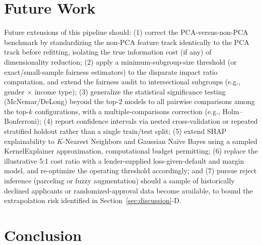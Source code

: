 \documentclass[journal]{IEEEtran}
\begin{document}
\section{Future Work}
\label{sec:futurework}

Future extensions of this pipeline should: (1) correct the PCA-versus-non-PCA benchmark by standardizing the non-PCA feature track identically to the PCA track before refitting, isolating the true information cost (if any) of dimensionality reduction; (2) apply a minimum-subgroup-size threshold (or exact/small-sample fairness estimators) to the disparate impact ratio computation, and extend the fairness audit to intersectional subgroups (e.g., gender $\times$ income type); (3) generalize the statistical significance testing (McNemar/DeLong) beyond the top-2 models to all pairwise comparisons among the top-$k$ configurations, with a multiple-comparisons correction (e.g., Holm--Bonferroni); (4) report confidence intervals via nested cross-validation or repeated stratified holdout rather than a single train/test split; (5) extend SHAP explainability to $K$-Nearest Neighbors and Gaussian Naïve Bayes using a sampled KernelExplainer approximation, computational budget permitting; (6) replace the illustrative 5:1 cost ratio with a lender-supplied loss-given-default and margin model, and re-optimize the operating threshold accordingly; and (7) pursue reject inference (parceling or fuzzy augmentation) should a sample of historically declined applicants or randomized-approval data become available, to bound the extrapolation risk identified in Section~\ref{sec:discussion}-D.

\section{Conclusion}
\label{sec:conclusion}
\end{document}
